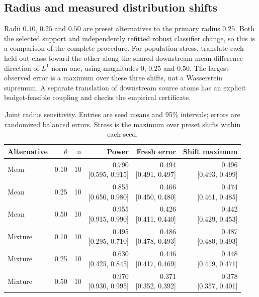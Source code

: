 \documentclass[11pt,a4paper]{article}
\begin{document}
\subsection{Radius and measured distribution shifts}
Radii $0.10$, $0.25$ and $0.50$ are preset alternatives to the primary radius
$0.25$. Both the selected support and independently refitted robust classifier
change, so this is a comparison of the complete procedure.
For population stress, translate each held-out class toward the other along the
shared downstream mean-difference direction of $L^1$ norm one, using magnitudes
$0$, $0.25$ and $0.50$. The largest observed error is a maximum over these three
shifts, not a Wasserstein supremum. A separate translation of downstream source
atoms has an explicit budget-feasible coupling and checks the empirical certificate.
\begin{table}[htbp]\centering\small\setlength{\tabcolsep}{3.5pt}
\caption{Joint radius sensitivity. Entries are seed means and 95\% intervals; errors are randomized balanced errors. Stress is the maximum over preset shifts within each seed.}\label{tab:radius}
\begin{tabularx}{\linewidth}{@{}p{22mm}rrrrr@{}}
\toprule Alternative & $\theta$ & $n$ & Power & Fresh error & Shift maximum \\
\midrule
Mean & 0.10 & 10 & \shortstack{0.790\\{[0.595, 0.915]}} & \shortstack{0.494\\{[0.491, 0.497]}} & \shortstack{0.496\\{[0.493, 0.499]}} \\
Mean & 0.25 & 10 & \shortstack{0.855\\{[0.650, 0.980]}} & \shortstack{0.466\\{[0.450, 0.480]}} & \shortstack{0.474\\{[0.461, 0.485]}} \\
Mean & 0.50 & 10 & \shortstack{0.955\\{[0.915, 0.990]}} & \shortstack{0.426\\{[0.411, 0.440]}} & \shortstack{0.442\\{[0.429, 0.453]}} \\
Mixture & 0.10 & 10 & \shortstack{0.495\\{[0.295, 0.710]}} & \shortstack{0.486\\{[0.478, 0.493]}} & \shortstack{0.487\\{[0.480, 0.493]}} \\
Mixture & 0.25 & 10 & \shortstack{0.630\\{[0.425, 0.845]}} & \shortstack{0.446\\{[0.417, 0.469]}} & \shortstack{0.448\\{[0.419, 0.471]}} \\
Mixture & 0.50 & 10 & \shortstack{0.970\\{[0.930, 0.995]}} & \shortstack{0.371\\{[0.352, 0.392]}} & \shortstack{0.378\\{[0.357, 0.401]}} \\
\bottomrule\end{tabularx}\end{table}
\end{document}
